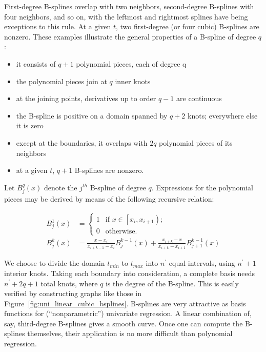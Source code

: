 \documentclass[12pt]{article}
\begin{document}
First-degree B-splines overlap with two neighbors, second-degree B-splines with four neighbors, and so on, with the leftmost and rightmost splines have being exceptions to this rule. At a given $t$, two first-degree (or four cubic) B-splines are nonzero. These examples illustrate the general properties of a B-spline of degree $q$:

\begin{itemize}
\item it consists of $q + 1$ polynomial pieces, each of degree q\\
\item the polynomial pieces join at $q$ inner knots\\
\item at the joining points, derivatives up to order $q - 1$ are continuous\\
\item the B-spline is positive on a domain spanned by $q +2$ knots; everywhere else it is zero\\
\item except at the boundaries, it overlaps with $2q$ polynomial pieces of its neighbors\\
\item at a given $t$, $q +1$ B-splines are nonzero.
\end{itemize}

Let $B_j^q\left(x\right)$ denote the $j^{th}$ B-spline of degree $q$. Expressions for the polynomial pieces may be derived by means of the following recursive relation:

\begin{align}
B_j^1\left(x\right) &= \left\{ \begin{array}{ll}
         1 & \mbox{if $x \in \left[x_i,x_{i+1}\right)$};\\
         0 & \mbox{otherwise}.\end{array} \right.\\
B_j^k\left(x\right) &= \frac{x-x_i}{x_{i+k-1}-x_i}B_j^{k-1}\left(x\right) + \frac{x_{i+k}-x}{x_{i+k}-x_{i+1}}B_{j+1}^{k-1}\left(x\right)         
\end{align}

We choose to divide the domain $t_{min}$ to $t_{max}$ into $n^\prime$ equal intervals, using $n^\prime +1$ interior knots. Taking each boundary into consideration, a complete basis needs $n^\prime + 2q + 1$ total knots, where $q$ is the degree of the B-spline. This is easily verified by constructing graphs like those in Figure~\ref{fig:uni_linear_cubic_bsplines}. B-splines are very attractive as basis functions for (``nonparametric'') univariate regression. A linear combination of, say, third-degree B-splines gives a smooth curve. Once one can compute the B-splines themselves, their application is no more difficult than polynomial regression.
\end{document}
